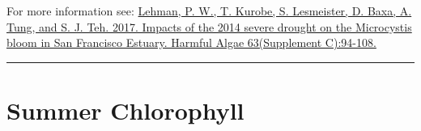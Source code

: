 \documentclass[
]{book}
\begin{document}
\begin{disclaimer}
For more information see:
\href{https://www.sciencedirect.com/science/article/pii/S1568988316302177}{Lehman,
P. W., T. Kurobe, S. Lesmeister, D. Baxa, A. Tung, and S. J. Teh. 2017.
Impacts of the 2014 severe drought on the Microcystis bloom in San
Francisco Estuary. Harmful Algae 63(Supplement C):94-108.}
\end{disclaimer}

\begin{center}\rule{0.5\linewidth}{0.5pt}\end{center}

\hypertarget{summer-chlorophyll}{%
\section{Summer Chlorophyll}\label{summer-chlorophyll}}
\end{document}
